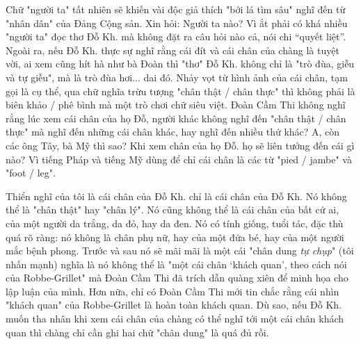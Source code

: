 \documentclass[../main.tex]{subfiles}
\begin{document}
\begin{multicols}{2}
Chữ "người ta" tất nhiên sẽ khiến vài độc giả thích "bới lá tìm sâu" nghĩ đến từ "nhân dân" của Đảng Cộng sản. Xin hỏi: Người ta nào? Vì ắt phải có khá nhiều "người ta" đọc thơ Đỗ Kh. mà không đặt ra câu hỏi nào cả, nói chi “quyết liệt”. Ngoài ra, nếu Đỗ Kh. thực sự nghĩ rằng cái đít và cái chân của chàng là tuyệt vời, ai xem cũng hít hà như bà Đoàn thì "thơ" Đỗ Kh. không chỉ là "trò đùa, giễu và tự giễu", mà là trò đùa hơi... dai đó. Nhảy vọt từ hình ảnh của cái chân, tạm gọi là cụ thể, qua chữ nghĩa trừu tượng "chân thật / chân thực" thì không phải là biên khảo / phê bình mà một trò chơi chữ siêu việt. Đoàn Cầm Thi không nghĩ rằng lúc xem cái chân của họ Đỗ, người khác không nghĩ đến "chân thật / chân thực" mà nghĩ đến những cái chân khác, hay nghĩ đến nhiều thứ khác? A, còn các ông Tây, bà Mỹ thì sao? Khi xem chân của họ Đỗ. họ sẽ liên tưởng đến cái gì nào? Vì tiếng Pháp và tiếng Mỹ dùng để chỉ cái chân là các từ "pied / jambe" và "foot / leg".  
 
Thiển nghĩ của tôi là cái chân của Đỗ Kh. chỉ là cái chân của Đỗ Kh. Nó không thể là "chân thật" hay "chân lý". Nó cũng không thể là cái chân của bất cứ ai, của một người da trắng, da đỏ, hay da đen. Nó có tính giống, tuổi tác, đặc thù quá rõ ràng: nó không là chân phụ nữ, hay của một đứa bé, hay của một người mắc bệnh phong. Trước và sau nó sẽ mãi mãi là một cái "chân dung \textit{tự chụp}" (tôi nhấn mạnh) nghĩa là nó không thể là "một cái chân ‘khách quan’, theo cách nói của Robbe-Grillet" mà Đoàn Cầm Thi đã trích dẫn quàng xiên để minh họa cho lập luận của mình. Hơn nữa, chỉ có Đoàn Cầm Thi mới tin chắc rằng cái nhìn "khách quan" của Robbe-Grillet là hoàn toàn khách quan. Dù sao, nếu Đỗ Kh. muốn tha nhân khi xem cái chân của chàng có thể nghĩ tới một cái chân khách quan thì chàng chỉ cần ghi hai chữ "chân dung" là quá đủ rồi.  
 

\end{multicols}
\end{document}
